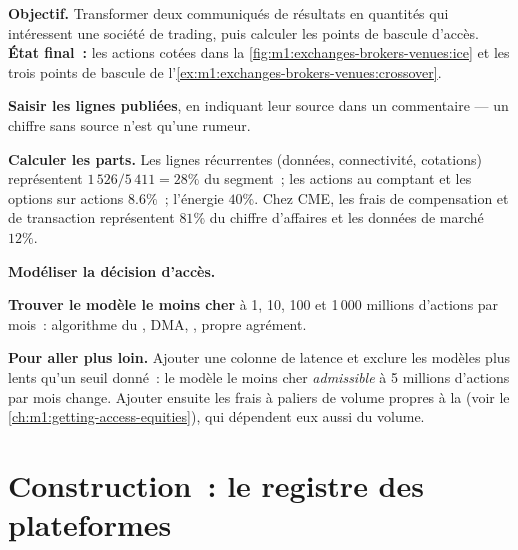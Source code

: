\begin{tutorial}
\textbf{Objectif.} Transformer deux communiqués de résultats en quantités qui intéressent une
société de trading, puis calculer les points de bascule d'accès. \textbf{État final~:} les
actions cotées dans la \cref{fig:m1:exchanges-brokers-venues:ice} et les trois
points de bascule de l'\cref{ex:m1:exchanges-brokers-venues:crossover}.
\begin{tutsteps}
\item \textbf{Saisir les lignes publiées}, en indiquant leur source dans un commentaire ---
un chiffre sans source n'est qu'une rumeur.
\label{lst:m1:exchanges-brokers-venues:data}
\item \textbf{Calculer les parts.} Les lignes récurrentes (données, connectivité,
cotations) représentent $1\,526/5\,411 = 28\%$ du segment~; les actions au comptant et
les options sur actions $8.6\%$~; l'énergie $40\%$. Chez CME, les frais de compensation et de transaction
représentent $81\%$ du chiffre d'affaires et les données de marché $12\%$.
\item \textbf{Modéliser la décision d'accès.}
\label{lst:m1:exchanges-brokers-venues:access}
\item \textbf{Trouver le modèle le moins cher} à 1, 10, 100 et 1\,000 millions
d'actions par mois~: algorithme du , DMA, , propre agrément.
\end{tutsteps}
\textbf{Pour aller plus loin.} Ajouter une colonne de latence et exclure les modèles plus lents
qu'un seuil donné~: le modèle le moins cher \emph{admissible} à 5 millions d'actions par
mois change. Ajouter ensuite les frais à paliers de volume propres à la 
(voir le \cref{ch:m1:getting-access-equities}), qui dépendent eux aussi du volume.
\end{tutorial}

\section{Construction~: le registre des plateformes}\label{bld:m1:exchanges-brokers-venues:registry}

